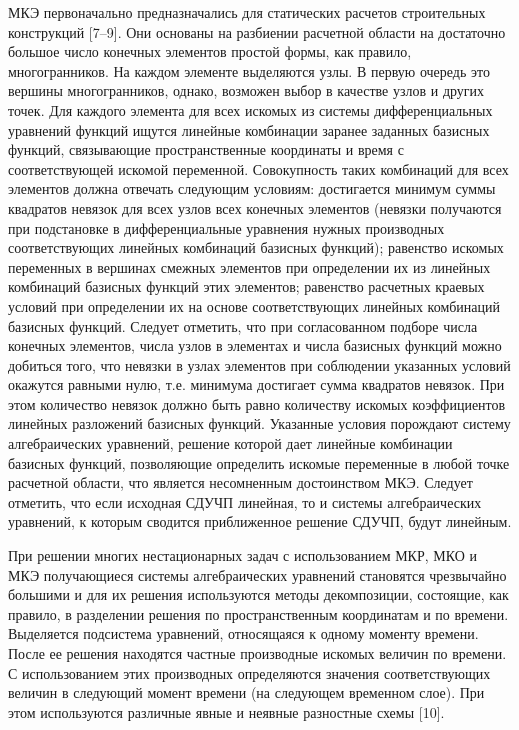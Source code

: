 \documentclass[a4paper,12pt]{article}
\begin{document}
МКЭ первоначально предназначались для статических расчетов
строительных конструкций [7–9]. Они основаны на разбиении расчетной
области на достаточно большое число конечных элементов простой формы,
как правило, многогранников.  На каждом элементе выделяются узлы. В
первую очередь это вершины многогранников, однако, возможен выбор в
качестве узлов и других точек. Для каждого элемента для всех искомых
из системы дифференциальных уравнений функций ищутся линейные
комбинации заранее заданных базисных функций, связывающие
пространственные координаты и время с соответствующей искомой
переменной. Совокупность таких комбинаций для всех элементов должна
отвечать следующим условиям: достигается минимум суммы квадратов
невязок для всех узлов всех конечных элементов (невязки получаются при
подстановке в дифференциальные уравнения нужных производных
соответствующих линейных комбинаций базисных функций); равенство
искомых переменных в вершинах смежных элементов при определении их из
линейных комбинаций базисных функций этих элементов; равенство
расчетных краевых условий при определении их на основе соответствующих
линейных комбинаций базисных функций. Следует отметить, что при
согласованном подборе числа конечных элементов, числа узлов в
элементах и числа базисных функций можно добиться того, что невязки в
узлах элементов при соблюдении указанных условий окажутся равными
нулю, т.е. минимума достигает сумма квадратов невязок.
При этом количество невязок должно быть равно количеству
искомых коэффициентов линейных разложений базисных функций.  Указанные
условия порождают систему алгебраических уравнений, решение которой
дает линейные комбинации базисных функций, позволяющие определить
искомые переменные в любой точке расчетной области, что является
несомненным достоинством МКЭ. Следует отметить, что если исходная
СДУЧП линейная, то и системы алгебраических уравнений, к которым
сводится приближенное решение СДУЧП, будут линейным.

При решении многих нестационарных задач с использованием МКР, МКО и
МКЭ получающиеся системы алгебраических уравнений становятся
чрезвычайно большими и для их решения используются методы
декомпозиции, состоящие, как правило, в разделении решения по
пространственным координатам и по времени.  Выделяется подсистема
уравнений, относящаяся к одному моменту времени.  После ее решения
находятся частные производные искомых величин по времени.  С
использованием этих производных определяются значения соответствующих
величин в следующий момент времени (на следующем временном слое). При
этом используются различные явные и неявные разностные схемы [10].
\end{document}
